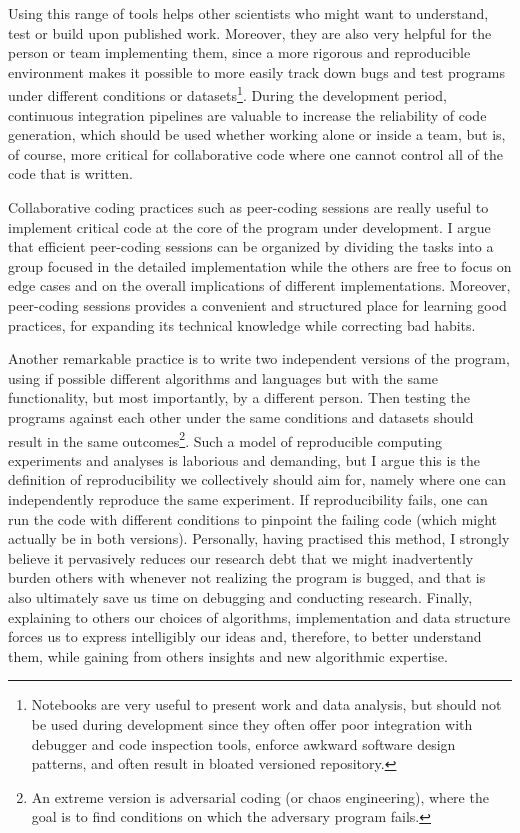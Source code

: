 Using this range of tools helps other scientists who might want to understand, test or build upon published work.
Moreover, they are also very helpful for the person or team implementing them, since a more rigorous and reproducible environment makes it possible to more easily track down bugs and test programs under different conditions or datasets\footnote{Notebooks are very useful to present work and data analysis, but should not be used during development since they often offer poor integration with debugger and code inspection tools, enforce awkward software design patterns, and often result in bloated versioned repository.}.
During the development period, continuous integration pipelines are valuable to increase the reliability of code generation, which should be used whether working alone or inside a team, but is, of course, more critical for collaborative code where one cannot control all of the code that is written.

Collaborative coding practices such as peer-coding sessions are really useful to implement critical code at the core of the program under development.
I argue that efficient peer-coding sessions can be organized by dividing the tasks into a group focused in the detailed implementation while the others are free to focus on edge cases and on the overall implications of different implementations.
Moreover, peer-coding sessions provides a convenient and structured place for learning good practices, for expanding its technical knowledge while correcting bad habits.

Another remarkable practice is to write two independent versions of the program, using if possible different algorithms and languages but with the same functionality, but most importantly, by a different person.
Then testing the programs against each other under the same conditions and datasets should result in the same outcomes\footnote{An extreme version is adversarial coding (or chaos engineering), where the goal is to find conditions on which the adversary program fails.}.
Such a model of reproducible computing experiments and analyses is laborious and demanding, but I argue this is the definition of reproducibility we collectively should aim for, namely where one can independently reproduce the same experiment.
If reproducibility fails, one can run the code with different conditions to pinpoint the failing code (which might actually be in both versions).
Personally, having practised this method, I strongly believe it pervasively reduces our research debt that we might inadvertently burden others with whenever not realizing the program is bugged, and that is also ultimately save us time on debugging and conducting research.
Finally, explaining to others our choices of algorithms, implementation and data structure forces us to express intelligibly our ideas and, therefore, to better understand them, while gaining from others insights and new algorithmic expertise.


